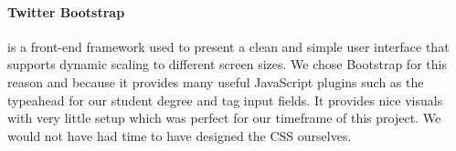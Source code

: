		\paragraph{Twitter Bootstrap\cite{bootstrap}} is a front-end framework used to present a clean and simple user interface that supports dynamic scaling to different screen sizes. We chose Bootstrap for this reason and because it provides many useful JavaScript plugins such as the typeahead for our student degree and tag input fields. It provides nice visuals with very little setup which was perfect for our timeframe of this project. We would not have had time to have designed the CSS ourselves.